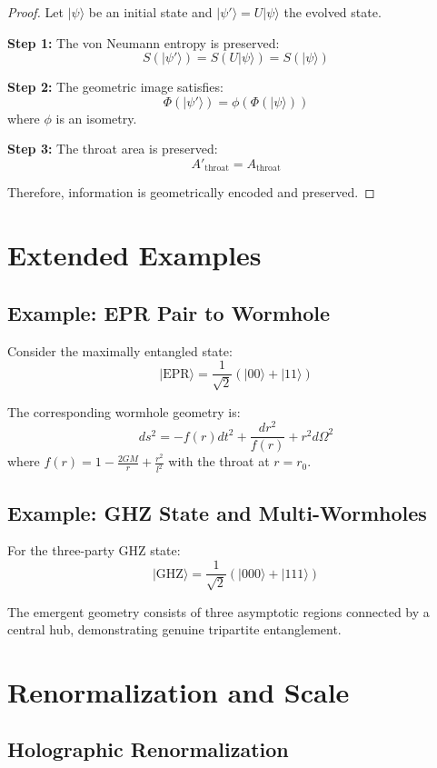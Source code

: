 \documentclass[11pt,a4paper]{article}
\begin{document}
\begin{proof}
Let $|\psi\rangle$ be an initial state and $|\psi'\rangle = U|\psi\rangle$ the evolved state.

\textbf{Step 1:} The von Neumann entropy is preserved:
\[
S(|\psi'\rangle) = S(U|\psi\rangle) = S(|\psi\rangle)
\]

\textbf{Step 2:} The geometric image satisfies:
\[
\Phi(|\psi'\rangle) = \phi(\Phi(|\psi\rangle))
\]
where $\phi$ is an isometry.

\textbf{Step 3:} The throat area is preserved:
\[
A'_{\text{throat}} = A_{\text{throat}}
\]

Therefore, information is geometrically encoded and preserved.
\end{proof}

\section{Extended Examples}

\subsection{Example: EPR Pair to Wormhole}

Consider the maximally entangled state:
\[
|\text{EPR}\rangle = \frac{1}{\sqrt{2}}(|00\rangle + |11\rangle)
\]

The corresponding wormhole geometry is:
\[
ds^2 = -f(r)dt^2 + \frac{dr^2}{f(r)} + r^2d\Omega^2
\]
where $f(r) = 1 - \frac{2GM}{r} + \frac{r^2}{l^2}$ with the throat at $r = r_0$.

\subsection{Example: GHZ State and Multi-Wormholes}

For the three-party GHZ state:
\[
|\text{GHZ}\rangle = \frac{1}{\sqrt{2}}(|000\rangle + |111\rangle)
\]

The emergent geometry consists of three asymptotic regions connected by a central hub, demonstrating genuine tripartite entanglement.

\section{Renormalization and Scale}

\subsection{Holographic Renormalization}
\end{document}
